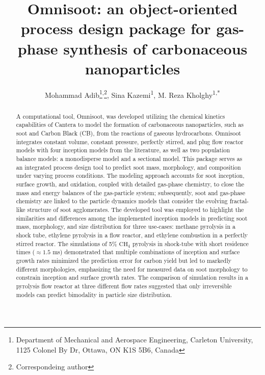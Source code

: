 \setcounter{page}{1} %


\title{\renewcommand\baselinestretch{1}\bf
	Omnisoot: an object-oriented process design package for gas-phase synthesis of carbonaceous nanoparticles
}
\renewcommand\baselinestretch{0.8}
\author{
	Mohammad Adib{\vspace{0.4em}}\footnote{\scriptsize{Department of Mechanical and Aerospace Engineering, Carleton University, 1125 Colonel By Dr, Ottawa, ON K1S 5B6, Canada}}{\hspace{0.3em}}\textsuperscript{,}{\hspace{0.01em}}\footnote{\scriptsize{Correspondeing author}},
	Sina Kazemi\textsuperscript{1}{\vspace{0.4em}},  
	M. Reza Kholghy\textsuperscript{1,*} 
}
\date{}
\maketitle
\renewcommand\baselinestretch{1.3}

\begin{abstract}
	A computational tool, Omnisoot, was developed utilizing the chemical kinetics capabilities of Cantera to model the formation of carbonaceous nanoparticles, such as soot and Carbon Black (CB), from the reactions of gaseous hydrocarbons. Omnisoot integrates constant volume, constant pressure, perfectly stirred, and plug flow reactor models with four inception models from the literature, as well as two population balance models: a monodisperse model and a sectional model. This package serves as an integrated process design tool to predict soot mass, morphology, and composition under varying process conditions. The modeling approach accounts for soot inception, surface growth, and oxidation, coupled with detailed gas-phase chemistry, to close the mass and energy balances of the gas-particle system; subsequently, soot and gas-phase chemistry are linked to the particle dynamics models that consider the evolving fractal-like structure of soot agglomerates. The developed tool was employed to highlight the similarities and differences among the implemented inception models in predicting soot mass, morphology, and size distribution for three use-cases: methane pyrolysis in a shock tube, ethylene pyrolysis in a flow reactor, and ethylene combustion in a perfectly stirred reactor. The simulations of 5\% $\mathrm{CH_4}$ pyrolysis in shock-tube with short residence times ($\approx1.5$ ms) demonstrated that multiple combinations of inception and surface growth rates minimized the prediction error for carbon yield but led to markedly different morphologies, emphasizing the need for measured data on soot morphology to constrain inception and surface growth rates. The comparison of simulation results in a pyrolysis flow reactor at three different flow rates suggested that only irreversible models can predict bimodality in particle size distribution. 
	
\end{abstract}
	